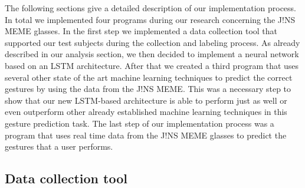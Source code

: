 \documentclass[runningheads]{llncs}
\begin{document}
The following sections give a detailed description of our implementation process. In total we implemented four programs during our research concerning the J!NS MEME glasses. In the first step we implemented a data collection tool that supported our test subjects during the collection and labeling process. As already described in our analysis section, we then decided to implement a neural network based on an LSTM architecture. After that we created a third program that uses several other state of the art machine learning techniques to predict the correct gestures by using the data from the J!NS MEME. This was a necessary step to show that our new LSTM-based architecture is able to perform just as well or even outperform other already established machine learning techniques in this gesture prediction task. The last step of our implementation process was a program that uses real time data from the J!NS MEME glasses to predict the gestures that a user performs.

\subsection{Data collection tool}
\end{document}
